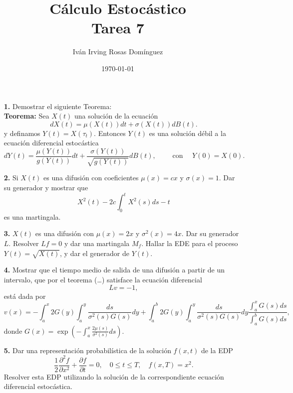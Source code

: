 \documentclass[letterpaper]{article}
\title{\textbf{Cálculo Estocástico\\
Tarea 7}}
\author{Iván Irving Rosas Domínguez}
\date{\today}
\newcommand{\1}{\mathds{1}}
\theoremstyle{definition}
\theoremstyle{definition}
\theoremstyle{definition}
\theoremstyle{definition}
\theoremstyle{definition}
\begin{document}
\maketitle


\begin{itemize}
    \item[\textbf{1.}] Demostrar el siguiente Teorema:\\
    
    \textbf{Teorema:}
    Sea $X(t)$ una solución de la ecuación 
    \[
        dX(t)=\mu(X(t))dt+\sigma(X(t))dB(t).  
    \]
    y definamos $Y(t)=X(\tau_t)$. Entonces $Y(t)$ es una solución débil a la ecuación
    diferencial estocástica 
    \[
        dY(t)=\frac{\mu(Y(t))}{g(Y(t))}dt+\frac{\sigma(Y(t))}{\sqrt{g(Y(t))}}dB(t), \qquad \text{ con } \quad Y(0)=X(0).   
    \]
    \item[\textbf{2.}] Si $X(t)$ es una difusión con coeficientes $\mu(x)=cx$ y $\sigma(x)=1$.
    Dar su generador y mostrar que 
    \[
    X^2(t)-2c\int_{0}^{t}X^2(s)ds-t    
    \]
    es una martingala.
    \item[\textbf{3.}] $X(t)$ es una difusión con $\mu(x)=2x$ y $\sigma^2(x)=4x$. Dar su generador 
    $L$. Resolver $Lf=0$ y dar una martingala $M_f$. Hallar la EDE para el proceso 
    $Y(t)=\sqrt{X(t)}$, y dar el generador de $Y(t)$.
    \item[\textbf{4.}] Mostrar que el tiempo medio de salida de una difusión a partir 
    de un intervalo, que por el teorema (\dots) satisface la ecuación diferencial 
    \[
        Lv=-1,
    \]
    está dada por 
    \[
    v(x)=-\int_{a}^{x}2G(y)\int_{a}^{y}\frac{ds}{\sigma^2(s)G(s)}dy+\int_{a}^{b}2G(y)\int_{a}^{y}\frac{ds}{\sigma^2(s)G(s)}dy\frac{\int_{a}^{x}G(s)ds}{\int_{a}^{b}G(s)ds},    
    \]
    donde $G(x)=\exp \left(-\int_{a}^{x}\frac{2\mu(s)}{\sigma^2(s)}ds\right)$.
    \item[\textbf{5.}] Dar una representación probabilística de la solución $f(x,t)$ de la EDP
    \[
        \frac{1}{2}\frac{\partial^2f}{\partial x^2}+\frac{\partial f}{\partial t}=0, \quad 0\leq t\leq T, \quad f(x,T)=x^2.    
    \]
    Resolver esta EDP utilizando la solución de la correspondiente ecuación diferencial estocástica.
\end{itemize}
\end{document}
